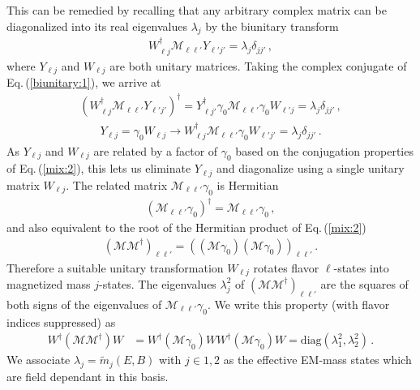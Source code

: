 \documentclass{ws-ijmpa}
\newcommand{\req}[1]{Eq.\,(\ref{#1})}
\begin{document}
This can be remedied by recalling that any arbitrary complex matrix can be diagonalized into its real eigenvalues $\lambda_{j}$ by the biunitary transform
\begin{align}
\label{biunitary:1}
W_{\ell j}^{\dag}\mathcal{M}_{\ell\ell'}Y_{\ell'j'}=\lambda_{j}\delta_{jj'}\,,
\end{align}
where $Y_{\ell j}$ and $W_{\ell j}$ are both unitary matrices. Taking the complex conjugate of \req{biunitary:1}, we arrive at
\begin{align}
\label{biunitary:2}
(W_{\ell j}^{\dag}\mathcal{M}_{\ell\ell'}Y_{\ell'j'})^{\dag} = 
Y_{\ell j'}^{\dag}\gamma_{0}\mathcal{M}_{\ell\ell'}\gamma_{0}W_{\ell' j}=\lambda_{j}\delta_{jj'}\,,
\end{align}
%
\begin{align}
Y_{\ell j}=\gamma_{0}W_{\ell j}\rightarrow
W_{\ell j}^{\dag}\mathcal{M}_{\ell\ell'}\gamma_{0}W_{\ell'j'}=\lambda_{j}\delta_{jj'}\,. 
\end{align}
As $Y_{\ell j}$ and $W_{\ell j}$ are related by a factor of $\gamma_{0}$ based on the conjugation properties of \req{mix:2}, this lets us eliminate $Y_{\ell j}$ and diagonalize using a single unitary matrix $W_{\ell j}$. The related matrix $\mathcal{M}_{\ell\ell'}\gamma_{0}$ is Hermitian
\begin{align}
\label{herm:1}
(\mathcal{M}_{\ell\ell'}\gamma_{0})^{\dag} = \mathcal{M}_{\ell\ell'}\gamma_{0}\,,
\end{align}
and also equivalent to the root of the Hermitian product of \req{mix:2}
\begin{align}
(\mathcal{M}\mathcal{M}^{\dag})_{\ell\ell'} = \left((\mathcal{M}\gamma_{0})(\mathcal{M}\gamma_{0})\right)_{\ell\ell'}\,.
\end{align}
Therefore a suitable unitary transformation $W_{\ell j}$ rotates flavor $\ell$-states into magnetized mass $j$-states. The eigenvalues $\lambda_{j}^{2}$ of $(\mathcal{M}\mathcal{M}^{\dag})_{\ell\ell'}$ are the squares of both signs of the eigenvalues of $\mathcal{M}_{\ell\ell'}\gamma_{0}$. We write this property (with flavor indices suppressed) as
\begin{align}
W^{\dag}(\mathcal{M}\mathcal{M}^{\dag})W &= W^{\dag}(\mathcal{M}\gamma_{0})WW^{\dag}(\mathcal{M}\gamma_{0})W = \mathrm{diag}(\lambda_{1}^{2},\lambda_{2}^{2})\,.
\end{align}
We associate $\lambda_{j}=\widetilde m_{j}(E,B)$ with $j\in1,2$ as the effective EM-mass states which are field dependant in this basis. 
\end{document}
